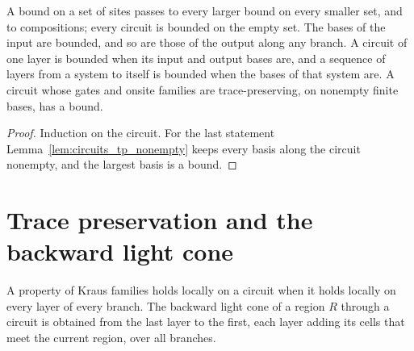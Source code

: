 \begin{lemma}[Bounds]
    \label{lem:circuits_dim_bounded}
    \leanok
    A bound on a set of sites passes to every larger bound on every smaller set, and to
    compositions; every circuit is bounded on the empty set. The bases of the input are
    bounded, and so are those of the output along any branch. A circuit of one layer is bounded
    when its input and output bases are, and a sequence of layers from a system to itself is
    bounded when the bases of that system are. A circuit whose gates and
    onsite families are trace-preserving, on nonempty finite bases, has a bound.
\end{lemma}
\begin{proof}\leanok
    Induction on the circuit. For the last statement Lemma~\ref{lem:circuits_tp_nonempty}
    keeps every basis along the circuit nonempty, and the largest basis is a bound.
\end{proof}

\section{Trace preservation and the backward light cone}
\label{sec:circuits_tp_light_cone}

\begin{definition}
    \label{def:circuits_local}
    \leanok
    A property of Kraus families holds locally on a circuit when it holds locally on
    every layer of every branch. The backward light cone of a region $R$ through a
    circuit is obtained from the last layer to the first, each layer adding its
    cells that meet the current region, over all branches.
\end{definition}

